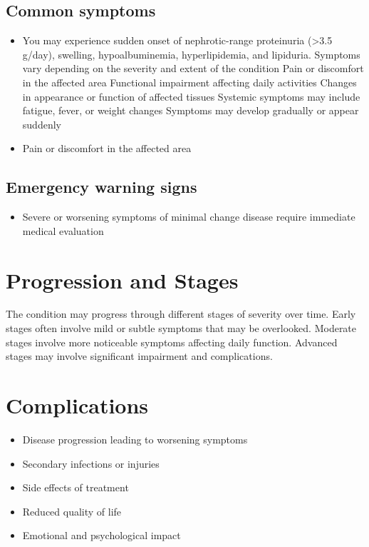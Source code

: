 \subsection{Common symptoms}
\begin{itemize}[noitemsep]
  \item You may experience sudden onset of nephrotic-range proteinuria (>3.5 g/day), swelling, hypoalbuminemia, hyperlipidemia, and lipiduria. Symptoms vary depending on the severity and extent of the condition Pain or discomfort in the affected area Functional impairment affecting daily activities Changes in appearance or function of affected tissues Systemic symptoms may include fatigue, fever, or weight changes Symptoms may develop gradually or appear suddenly
  \item Pain or discomfort in the affected area
  \end{itemize}

\subsection{Emergency warning signs}
\begin{itemize}[noitemsep]
  \item Severe or worsening symptoms of minimal change disease require immediate medical evaluation
\end{itemize}
\section{Progression and Stages}
The condition may progress through different stages of severity over time. Early stages often involve mild or subtle symptoms that may be overlooked. Moderate stages involve more noticeable symptoms affecting daily function. Advanced stages may involve significant impairment and complications.
\section{Complications}
\begin{itemize}[noitemsep]
  \item Disease progression leading to worsening symptoms
  \item Secondary infections or injuries
  \item Side effects of treatment
  \item Reduced quality of life
  \item Emotional and psychological impact
\end{itemize}
